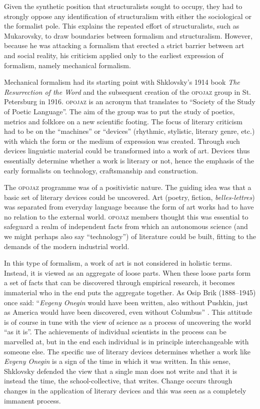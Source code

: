 \documentclass[output=paper]{langscibook}
\begin{document}
Given the synthetic position that structuralists sought to occupy, they had to strongly oppose any identification of structuralism with either the sociological or the formalist pole. This explains the repeated effort of structuralists, such as Mukarovsky, to draw boundaries between formalism and structuralism. However, because he was attacking a formalism that erected a strict barrier between art and social reality, his criticism applied only to the earliest expression of formalism, namely mechanical formalism.

Mechanical formalism had its starting point with Shklovsky's 1914 book \emph{The Resurrection of the Word} and the subsequent creation of the \textsc{opojaz} group in St. Petersburg in 1916. \textsc{opojaz} is an acronym that translates to ``Society of the Study of Poetic Language''. The aim of the group was to put the study of poetics, metrics and folklore on a new scientific footing. The focus of literary criticism had to be on the ``machines'' or ``devices'' (rhythmic, stylistic, literary genre, etc.) with which the form or the medium of expression was created. Through such devices linguistic material could be transformed into a work of art. Devices thus essentially determine whether a work is literary or not, hence the emphasis of the early formalists on technology, craftsmanship and construction.

The \textsc{opojaz} programme was of a positivistic nature. The guiding idea was that a basic set of literary devices could be uncovered. Art (poetry, fiction, \emph{belles-lettres}) was separated from everyday language because the form of art works had to have no relation to the external world. \textsc{opojaz} members thought this was essential to safeguard a realm of independent facts from which an autonomous science (and we might perhaps also say ``technology'') of literature could be built, fitting to the demands of the modern industrial world.

In this type of formalism, a work of art is not considered in holistic terms. Instead, it is viewed as an aggregate of loose parts. When these loose parts form a set of facts that can be discovered through empirical research, it becomes immaterial who in the end puts the aggregate together. As Osip Brik (1888--1945) once said: ``\emph{Evgeny Onegin} would have been written, also without Pushkin, just as America would have been discovered, even without Columbus'' \citep[213]{Brik1923}. This attitude is of course in tune with the view of science as a process of uncovering the world ``as it is''. The achievements of individual scientists in the process can be marvelled at, but in the end each individual is in principle interchangeable with someone else. The specific use of literary devices determines whether a work like \emph{Evgeny Onegin} is a sign of the time in which it was written. In this sense, Shklovsky defended the view that a single man does not write and that it is instead the time, the school-collective, that writes. Change occurs through changes in the application of literary devices and this was seen as a completely immanent process.
\end{document}
